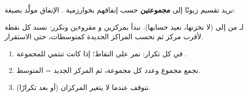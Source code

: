 \begin{statement}
نريد تقسيم  زبونًا إلى \textbf{مجموعتين} حسب إنفاقهم بخوارزمية \textbf{}. الإنفاق مولَّد بصيغة: \par{\centering\small{}\par} لـ  من  إلى  (لا نخزنها، نعيد حسابها). نبدأ بمركزين  و مقروءين ونكرر: نسند كل نقطة لأقرب مركز ثم نحسب المراكز الجديدة كمتوسطات، حتى الاستقرار.
\end{statement}
\begin{stepsbox}\begin{enumerate}
\item في كل تكرار: نمر على النقاط؛ إذا كانت  تنتمي للمجموعة .
\item نجمع مجموع وعدد كل مجموعة، ثم المركز الجديد = المتوسط.
\item نتوقف عندما لا يتغير المركزان (أو بعد  تكرارًا).
\end{enumerate}\end{stepsbox}
